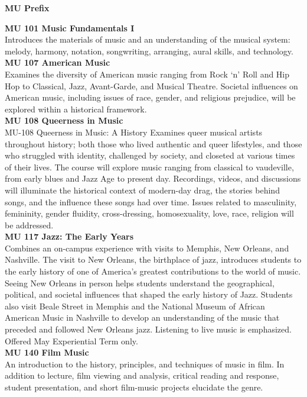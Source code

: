 \documentclass[
  letterpaper,
]{scrbook}
\begin{document}
\textbf{MU Prefix}

\textbf{MU 101 Music Fundamentals I}\\
Introduces the materials of music and an understanding of the musical
system: melody, harmony, notation, songwriting, arranging, aural skills,
and technology.\\
\textbf{MU 107 American Music}\\
Examines the diversity of American music ranging from Rock `n' Roll and
Hip Hop to Classical, Jazz, Avant-Garde, and Musical Theatre. Societal
influences on American music, including issues of race, gender, and
religious prejudice, will be explored within a historical framework.\\
\textbf{MU 108 Queerness in Music}\\
MU-108 Queerness in Music: A History Examines queer musical artists
throughout history; both those who lived authentic and queer lifestyles,
and those who struggled with identity, challenged by society, and
closeted at various times of their lives. The course will explore music
ranging from classical to vaudeville, from early blues and Jazz Age to
present day. Recordings, videos, and discussions will illuminate the
historical context of modern-day drag, the stories behind songs, and the
influence these songs had over time. Issues related to masculinity,
femininity, gender fluidity, cross-dressing, homosexuality, love, race,
religion will be addressed.\\
\textbf{MU 117 Jazz: The Early Years}\\
Combines an on-campus experience with visits to Memphis, New Orleans,
and Nashville. The visit to New Orleans, the birthplace of jazz,
introduces students to the early history of one of America's greatest
contributions to the world of music. Seeing New Orleans in person helps
students understand the geographical, political, and societal influences
that shaped the early history of Jazz. Students also visit Beale Street
in Memphis and the National Museum of African American Music in
Nashville to develop an understanding of the music that preceded and
followed New Orleans jazz. Listening to live music is emphasized.
Offered May Experiential Term only.\\
\textbf{MU 140 Film Music}\\
An introduction to the history, principles, and techniques of music in
film. In addition to lecture, film viewing and analysis, critical
reading and response, student presentation, and short film-music
projects elucidate the genre.\\
\end{document}
